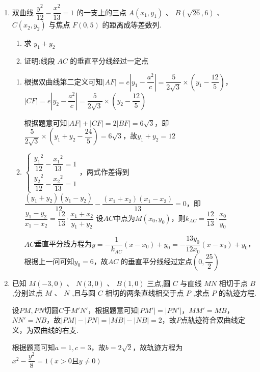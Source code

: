 \begin{enumerate}
\begin{jieda}
\begin{enumerate}
            综上，$k \in \left( {2,2\sqrt{2}}\right)$时满足要求.
        \end{enumerate}
    \end{jieda}
    
    \item 双曲线 $\dfrac{{y}^{2}}{12} - \dfrac{{x}^{2}}{13} = 1$ 的一支上的三点 $A\left( {{x}_{1},{y}_{1}}\right)$ 、 ${B}\left( {\sqrt{26},6}\right)$ 、 ${C}\left( {{x}_{2},{y}_{2}}\right)$ 与焦点 $F\left( {0,5}\right)$ 的距离成等差数列. 
    \begin{enumerate}
        \item 求 ${y}_{1} + {y}_{2}$
        \item 证明:线段 ${AC}$ 的垂直平分线经过一定点
    \end{enumerate}
    \begin{jieda}
        \begin{enumerate}
            \item 根据双曲线第二定义可知$|AF| = e\left|y_1-\dfrac{a^2}{c}\right| = \dfrac{5}{2\sqrt{3}} \times \left(y_1-\dfrac{12}{5}\right)$，$|CF| = e\left|y_2-\dfrac{a^2}{c}\right| = \dfrac{5}{2\sqrt{3}} \times \left(y_2-\dfrac{12}{5}\right)$

            根据题意可知$|AF|+|CF| = 2|BF| = 6\sqrt{3}$，即$\dfrac{5}{2\sqrt{3}} \times \left(y_1+y_2-\dfrac{24}{5}\right) = 6\sqrt{3}$，故$y_1+y_2 = 12$
            
            \item $\left\{\begin{array}{l}
                 \dfrac{{y_1}^{2}}{12} - \dfrac{{x_1}^{2}}{13} = 1  \\
                 \dfrac{{y_2}^{2}}{12} - \dfrac{{x_2}^{2}}{13} = 1
            \end{array}\right.$，两式作差得到$\dfrac{(y_1+y_2)(y_1-y_2)}{12} - \dfrac{(x_1+x_2)(x_1-x_2)}{13} = 0$，即$\dfrac{y_1-y_2}{x_1-x_2} = \dfrac{12}{13} \cdot \dfrac{x_1+x_2}{y_1+y_2}$
            设$AC$中点为$M(x_0, y_0)$，则$k_{AC} = \dfrac{12}{13} \cdot \dfrac{x_0}{y_0}$

            $AC$垂直平分线方程为$y = -\dfrac{1}{k_{AC}} (x - x_0) + y_0 = -\dfrac{13y_0}{12x_0}(x-x_0)+y_0$，根据上一问可知$y_0 = 6$，故${AC}$ 的垂直平分线经过定点$\left( {0,\dfrac{25}{2}}\right)$
        \end{enumerate}
    \end{jieda}
    
    \item 已知 $M\left( {-3,0}\right) \text{ 、 }N\left( {3,0}\right) \text{ 、 }B\left( {1,0}\right)$ 三点,圆 $C$ 与直线 ${MN}$ 相切于点 $B$ ,分别过点 $M\text{ 、 }N$ ,且与圆 $C$ 相切的两条直线相交于点 $P$ ,求点 $P$ 的轨迹方程.
    \begin{jieda}
        设$PM, PN$切圆$C$于$M'N'$，根据题意可知$|PM'| = |PN'|$，$MM' = MB$，$NN' = NB$，故$|PM| - |PN| = |MB| - |NB| = 2$，故$P$点轨迹符合双曲线定义，为双曲线的右支.

        根据题意可知$a = 1, c = 3$，故$b = 2\sqrt{2}$，故轨迹方程为${x}^{2} - \dfrac{{y}^{2}}{8} = 1\left( x > 0 \text{且} {y \neq  0}\right)$
    \end{jieda}
\end{enumerate}
